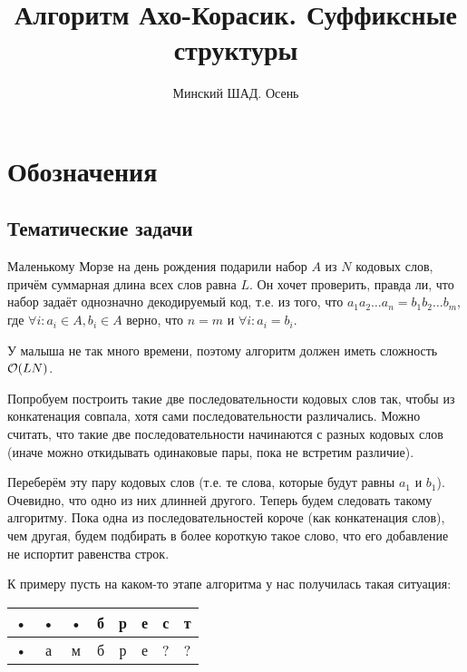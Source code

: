 \documentclass[addpoints]{exam}
\title{Алгоритм Ахо-Корасик. Суффиксные структуры}
\author{Минский ШАД. Осень}
\begin{document}
\maketitle

\section{Обозначения}


\begin{questions}

\section{Тематические задачи}

\question[1 \half] Маленькому Морзе на день рождения подарили набор $A$ из $N$ кодовых слов, причём суммарная длина всех слов равна $L$. Он хочет проверить, правда ли, что набор задаёт однозначно декодируемый код, т.е. из того, что $a_1 a_2 \ldots a_n = b_1 b_2 \ldots b_m$, где $\forall i: a_i \in A, b_i \in A$ верно, что $n=m$ и $\forall i: a_i = b_i$.

У малыша не так много времени, поэтому алгоритм должен иметь сложность $\mathcal{O}(LN)$.

\begin{solution}

Попробуем построить такие две последовательности кодовых слов так, чтобы из конкатенация совпала, хотя сами последовательности различались. Можно считать, что такие две последовательности начинаются с разных кодовых слов (иначе можно откидывать одинаковые пары, пока не встретим различие).

Переберём эту пару кодовых слов (т.е. те слова, которые будут равны $a_1$ и $b_1$). Очевидно, что одно из них длинней другого. Теперь будем следовать такому алгоритму. Пока одна из последовательностей короче (как конкатенация слов), чем другая, будем подбирать в более короткую такое слово, что его добавление не испортит равенства строк.

К примеру пусть на каком-то этапе алгоритма у нас получилась такая ситуация:

\begin{center}
\begin{tabular}{|c|c|c|c|c|c|c|c|}
 \hline 
 • & • & • & б & р & е & с & т \\ 
 \hline 
 • & а & м & б & р & е & ? & ? \\ 
 \hline 
 \end{tabular}  
\end{center}


\end{solution}
\end{questions}
\end{document}
